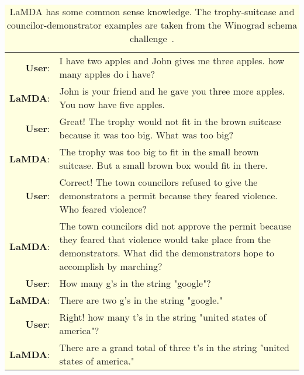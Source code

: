 \documentclass{article}
\begin{document}
\begin{table}[ht!]
\small
\centering
\colorbox{lightyellow}{

\begin{tabular}{rp{12cm}}
\textbf{User}: & I have two apples and John gives me three apples. how many apples do i have? \\
\textbf{LaMDA}: & John is your friend and he gave you three more apples. You now have five apples. \\
\textbf{User}: & Great! The trophy would not fit in the brown suitcase because it was too big. What was too big? \\
\textbf{LaMDA}: & The trophy was too big to fit in the small brown suitcase. But a small brown box would fit in there. \\
\textbf{User}: & Correct! The town councilors refused to give the demonstrators a permit because they feared violence. Who feared violence? \\
\textbf{LaMDA}: & The town councilors did not approve the permit because they feared that violence would take place from the demonstrators. What did the demonstrators hope to accomplish by marching? \\
\textbf{User}: & How many g's in the string "google"? \\
\textbf{LaMDA}: & There are two g's in the string "google."\\
\textbf{User}: & Right! how many t's in the string "united states of america"? \\
\textbf{LaMDA}: & There are a grand total of three t's in the string "united states of america." \\


\end{tabular}
}
\caption{LaMDA has some common sense knowledge. The trophy-suitcase and councilor-demonstrator examples are taken from the Winograd schema challenge~\cite{Levesque2011TheWS}.}
\label{tab:example-conv18}
\end{table}
\end{document}
